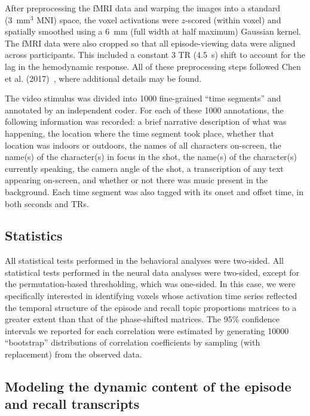 \documentclass[10pt]{article}
\begin{document}
After preprocessing the fMRI data and warping the images into a standard (3~mm$^3$ MNI) space, the voxel activations were $z$-scored (within voxel) and spatially smoothed using a 6~mm (full width at half maximum) Gaussian kernel.  The fMRI data were also cropped so that all episode-viewing data were aligned across participants.  This included a constant 3 TR (4.5~s) shift to account for the lag in the hemodynamic response.  All of these preprocessing steps followed Chen et al. (2017)~\citep{ChenEtal17}, where additional details may be found.

The video stimulus was divided into 1000 fine-grained ``time segments'' and annotated by an independent coder.  For each of these 1000 annotations, the following information was recorded: a brief narrative description of what was happening, the location where the time segment took place, whether that location was indoors or outdoors, the names of all characters on-screen, the name(s) of the character(s) in focus in the shot, the name(s) of the character(s) currently speaking, the camera angle of the shot, a transcription of any text appearing on-screen, and whether or not there was music present in the background.  Each time segment was also tagged with its onset and offset time, in both seconds and TRs.

\subsection*{Statistics}
All statistical tests performed in the behavioral analyses were two-sided.  All statistical tests performed in the neural data analyses were two-sided, except for the permutation-based thresholding, which was one-sided.  In this case, we were specifically interested in identifying voxels whose activation time series reflected the temporal structure of the episode and recall topic proportions matrices to a greater extent than that of the phase-shifted matrices.  The 95\% confidence intervals we reported for each correlation were estimated by generating 10000 ``bootstrap'' distributions of correlation coefficients by sampling (with replacement) from the observed data.

\subsection*{Modeling the dynamic content of the episode and recall transcripts}
\end{document}
